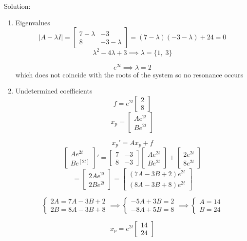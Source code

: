 \documentclass[12pt]{article}
\begin{document}
Solution:
\begin{enumerate}
    \item Eigenvalues 
    \[|A - \lambda I| = \begin{bmatrix}
        7 - \lambda & -3\\
        8 & -3 - \lambda
    \end{bmatrix} = (7 - \lambda)(-3-\lambda) + 24 = 0\]
    \[\lambda^2 - 4\lambda + 3 \implies \lambda = \{1, \; 3\}\]

    \[e^{2t} \implies \lambda = 2\]
    which does not coincide with the roots of the system so no resonance occurs 

    \item Undetermined coefficients
    \[f = e^{2t} \begin{bmatrix}
        2\\8
    \end{bmatrix}\]
    \[x_p = \begin{bmatrix}
        Ae^{2t}\\
        Be^{2t}
    \end{bmatrix}\]

    \[x_p' = Ax_p + f\]
    \[\begin{bmatrix}
        Ae^{2t}\\
        Be^[2t]
    \end{bmatrix}' = \begin{bmatrix}
        7 & -3\\
        8 & -3
    \end{bmatrix} \begin{bmatrix}
        Ae^{2t}\\
        Be^{2t}
    \end{bmatrix} + \begin{bmatrix}
        2e^{2t}\\
        8e^{2t}
    \end{bmatrix}\]
    \[= \begin{bmatrix}
        2Ae^{2t}\\
        2Be^{2t}
    \end{bmatrix} = \begin{bmatrix}
        (7A - 3B + 2)e^{2t}\\
        (8A - 3B + 8)e^{2t}
    \end{bmatrix}\]

    \[\begin{cases}
        2A = 7A - 3B + 2\\
        2B = 8A - 3B + 8
    \end{cases} \implies \begin{cases}
        -5A + 3B = 2\\
        -8A + 5B = 8
    \end{cases} \implies \begin{cases}
        A = 14\\
        B = 24
    \end{cases}\]

    \[\boxed{x_p = e^{2t} \begin{bmatrix}
        14\\24
    \end{bmatrix}}\]
\end{enumerate}
\end{document}
